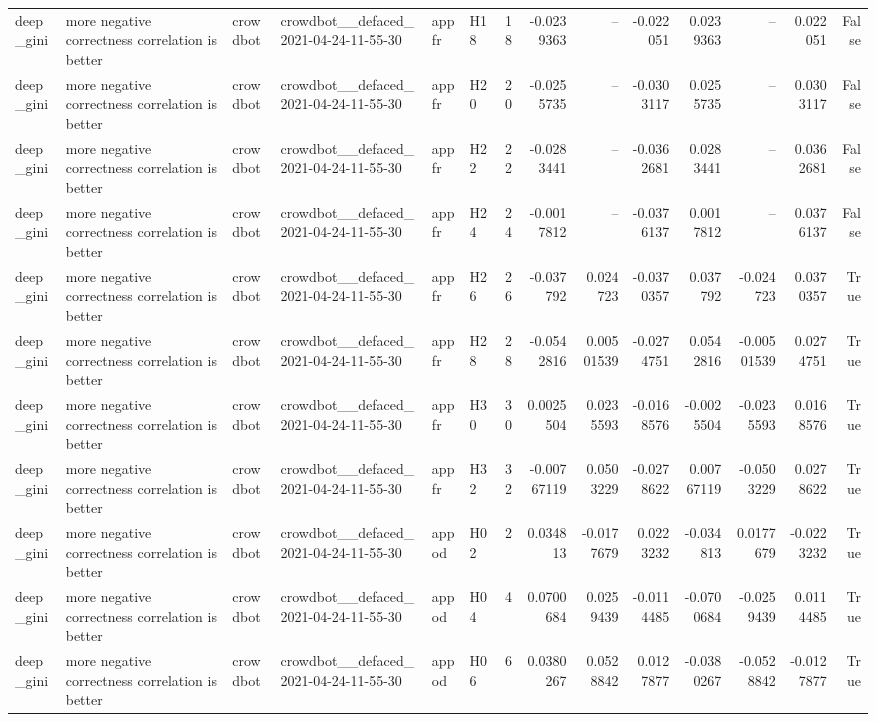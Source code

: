 \begin{longtable}{llllllrrrrrrrr}
deep\_gini & more negative correctness correlation is better & crowdbot & crowdbot\_\_defaced\_2021-04-24-11-55-30 & appfr & H18 & 18 & -0.0239363 & -- & -0.022051 & 0.0239363 & -- & 0.022051 & False \\
deep\_gini & more negative correctness correlation is better & crowdbot & crowdbot\_\_defaced\_2021-04-24-11-55-30 & appfr & H20 & 20 & -0.0255735 & -- & -0.0303117 & 0.0255735 & -- & 0.0303117 & False \\
deep\_gini & more negative correctness correlation is better & crowdbot & crowdbot\_\_defaced\_2021-04-24-11-55-30 & appfr & H22 & 22 & -0.0283441 & -- & -0.0362681 & 0.0283441 & -- & 0.0362681 & False \\
deep\_gini & more negative correctness correlation is better & crowdbot & crowdbot\_\_defaced\_2021-04-24-11-55-30 & appfr & H24 & 24 & -0.0017812 & -- & -0.0376137 & 0.0017812 & -- & 0.0376137 & False \\
deep\_gini & more negative correctness correlation is better & crowdbot & crowdbot\_\_defaced\_2021-04-24-11-55-30 & appfr & H26 & 26 & -0.037792 & 0.024723 & -0.0370357 & 0.037792 & -0.024723 & 0.0370357 & True \\
deep\_gini & more negative correctness correlation is better & crowdbot & crowdbot\_\_defaced\_2021-04-24-11-55-30 & appfr & H28 & 28 & -0.0542816 & 0.00501539 & -0.0274751 & 0.0542816 & -0.00501539 & 0.0274751 & True \\
deep\_gini & more negative correctness correlation is better & crowdbot & crowdbot\_\_defaced\_2021-04-24-11-55-30 & appfr & H30 & 30 & 0.0025504 & 0.0235593 & -0.0168576 & -0.0025504 & -0.0235593 & 0.0168576 & True \\
deep\_gini & more negative correctness correlation is better & crowdbot & crowdbot\_\_defaced\_2021-04-24-11-55-30 & appfr & H32 & 32 & -0.00767119 & 0.0503229 & -0.0278622 & 0.00767119 & -0.0503229 & 0.0278622 & True \\
deep\_gini & more negative correctness correlation is better & crowdbot & crowdbot\_\_defaced\_2021-04-24-11-55-30 & appod & H02 & 2 & 0.034813 & -0.0177679 & 0.0223232 & -0.034813 & 0.0177679 & -0.0223232 & True \\
deep\_gini & more negative correctness correlation is better & crowdbot & crowdbot\_\_defaced\_2021-04-24-11-55-30 & appod & H04 & 4 & 0.0700684 & 0.0259439 & -0.0114485 & -0.0700684 & -0.0259439 & 0.0114485 & True \\
deep\_gini & more negative correctness correlation is better & crowdbot & crowdbot\_\_defaced\_2021-04-24-11-55-30 & appod & H06 & 6 & 0.0380267 & 0.0528842 & 0.0127877 & -0.0380267 & -0.0528842 & -0.0127877 & True \\

\end{longtable}
